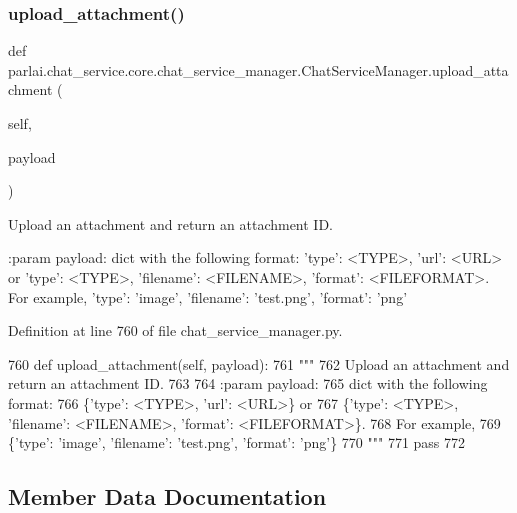 \subsubsection{\texorpdfstring{upload\+\_\+attachment()}{upload\_attachment()}}
{\footnotesize\ttfamily def parlai.\+chat\+\_\+service.\+core.\+chat\+\_\+service\+\_\+manager.\+Chat\+Service\+Manager.\+upload\+\_\+attachment (\begin{DoxyParamCaption}\item[{}]{self,  }\item[{}]{payload }\end{DoxyParamCaption})}

\begin{DoxyVerb}Upload an attachment and return an attachment ID.

:param payload:
    dict with the following format:
{'type': <TYPE>, 'url': <URL>} or
{'type': <TYPE>, 'filename': <FILENAME>, 'format': <FILEFORMAT>}.
For example,
{'type': 'image', 'filename': 'test.png', 'format': 'png'}
\end{DoxyVerb}
 

Definition at line 760 of file chat\+\_\+service\+\_\+manager.\+py.


\begin{DoxyCode}
760     \textcolor{keyword}{def }upload\_attachment(self, payload):
761         \textcolor{stringliteral}{"""}
762 \textcolor{stringliteral}{        Upload an attachment and return an attachment ID.}
763 \textcolor{stringliteral}{}
764 \textcolor{stringliteral}{        :param payload:}
765 \textcolor{stringliteral}{            dict with the following format:}
766 \textcolor{stringliteral}{                \{'type': <TYPE>, 'url': <URL>\} or}
767 \textcolor{stringliteral}{                \{'type': <TYPE>, 'filename': <FILENAME>, 'format': <FILEFORMAT>\}.}
768 \textcolor{stringliteral}{                For example,}
769 \textcolor{stringliteral}{                \{'type': 'image', 'filename': 'test.png', 'format': 'png'\}}
770 \textcolor{stringliteral}{        """}
771         \textcolor{keywordflow}{pass}
772 \end{DoxyCode}


\subsection{Member Data Documentation}
\mbox{\label{classparlai_1_1chat__service_1_1core_1_1chat__service__manager_1_1ChatServiceManager_a3bfa14f0b887a82a34379087c64afda5}} 
